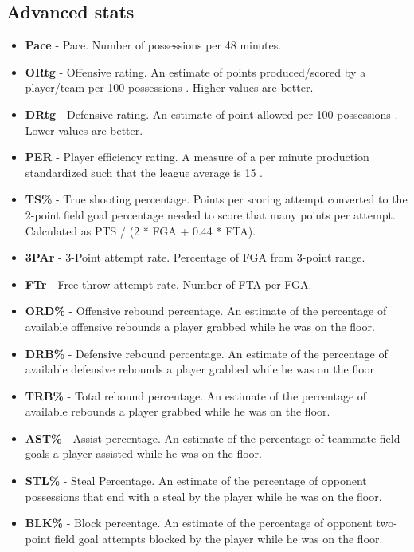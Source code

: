 \documentclass[a4paper]{article}
\begin{document}
\subsection{Advanced stats}
\label{subsec:advanced_stats}

\begin{itemize}
	\item \textbf{Pace} - Pace. Number of possessions per 48 minutes.
	\item \textbf{ORtg} - Offensive rating. An estimate of points produced/scored by a player/team per 100 possessions \cite{odrt}. Higher values are better.
	\item \textbf{DRtg} - Defensive rating. An estimate of point allowed per 100 possessions \cite{odrt}. Lower values are better.  
	\item \textbf{PER} - Player efficiency rating. A measure of a per minute production standardized such that the league average is 15 \cite{per}.
	\item \textbf{TS\%} - True shooting percentage. Points per scoring attempt converted to the 2-point field goal percentage needed to score that many points per attempt. Calculated as  PTS / (2 *  FGA + 0.44 * FTA). 
	\item \textbf{3PAr} - 3-Point attempt rate. Percentage of FGA from 3-point range.
	\item \textbf{FTr} - Free throw attempt rate. Number of FTA per FGA.
	\item \textbf{ORD\%} - Offensive rebound percentage. An estimate of the percentage of available offensive rebounds a player grabbed while he was on the floor.
	\item \textbf{DRB\%} - Defensive rebound percentage. An estimate of the percentage of available defensive rebounds a player grabbed while he was on the floor
	\item \textbf{TRB\%} - Total rebound percentage. An estimate of the percentage of available rebounds a player grabbed while he was on the floor. 
	\item \textbf{AST\%} - Assist percentage. An estimate of the percentage of teammate field goals a player assisted while he was on the floor.
	\item \textbf{STL\%} - Steal Percentage. An estimate of the percentage of opponent possessions that end with a steal by the player while he was on the floor. 
	\item \textbf{BLK\%} - Block percentage. An estimate of the percentage of opponent two-point field goal attempts blocked by the player while he was on the floor. 

\end{itemize}
\end{document}
